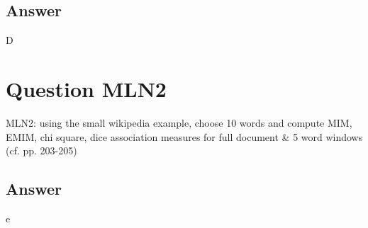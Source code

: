 \documentclass[letterpaper,11pt]{article}
\begin{document}
\subsection*{Answer}
D
    
\noindent\makebox[\linewidth]{\rule{\textwidth}{0.4pt}}


\section*{Question MLN2}
\begin{spverbatim}
MLN2: using the small wikipedia example, choose 10 words and compute MIM, EMIM, chi square, dice association measures for full document & 5 word windows (cf. pp. 203-205)
\end{spverbatim}

\subsection*{Answer}
e

\medskip


\end{document}
